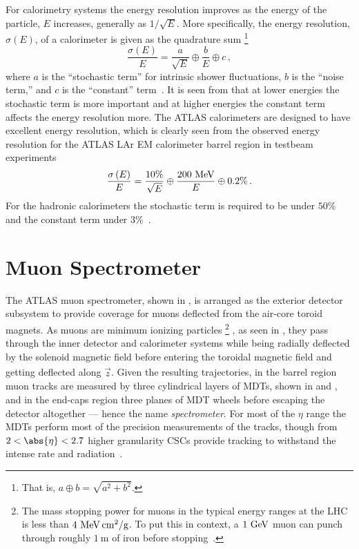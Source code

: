 For calorimetry systems the energy resolution improves as the energy of the particle, $E$ increases, generally as $1/\sqrt{E}$.
More specifically, the energy resolution, $\sigma\left(E\right)$, of a calorimeter is given as the quadrature sum%
\footnote{That is, $a \oplus b = \sqrt{a^{2} + b^{2}}$.}
\begin{equation}
 \frac{\sigma\left(E\right)}{E} = \frac{a}{\sqrt{E}} \oplus \frac{b}{E} \oplus c\,,
 \label{eq:calorimeter_energy_resolution}
\end{equation}
where $a$ is the ``stochastic term'' for intrinsic shower fluctuations, $b$ is the ``noise term,'' and $c$ is the ``constant'' term~\cite{Fabjan:692252}.
It is seen from  that at lower energies the stochastic term is more important and at higher energies the constant term affects the energy resolution more.
The ATLAS calorimeters are designed to have excellent energy resolution, which is clearly seen from the observed energy resolution for the ATLAS LAr EM calorimeter barrel region in testbeam experiments~\cite{Ilic:2014,Aleksa:1547314}
\[
 \frac{\sigma\left(E\right)}{E} = \frac{10\%}{\sqrt{E}} \oplus \frac{200~\mathrm{MeV}}{E} \oplus 0.2\%\,.
\]
For the hadronic calorimeters the stochastic term is required to be under $50\%$ and the constant term under $3\%$~\cite{Ilic:2014}.

\section{Muon Spectrometer}\label{sec:ATLAS_muon_spectrometer}

The ATLAS \gls{muon spectrometer}, shown in , is arranged as the exterior detector subsystem to provide coverage for muons deflected from the air-core toroid magnets.
As muons are minimum ionizing particles%
\footnote{The mass stopping power for muons in the typical energy ranges at the LHC is less than $4~\mathrm{MeV}\,\mathrm{cm}^{2}/\mathrm{g}$.
 To put this in context, a $1~\mathrm{GeV}$ muon can punch through roughly $1~\mathrm{m}$ of iron before stopping~\cite{Garutti:lecture}.}
, as seen in , they pass through the inner detector and calorimeter systems while being radially deflected by the solenoid magnetic field before entering the toroidal magnetic field and getting deflected along $\hat{\vec{z}}$.
Given the resulting trajectories, in the barrel region muon tracks are measured by three cylindrical layers of \glspl{MDT}, shown in  and , and in the end-caps region three planes of MDT wheels before escaping the detector altogether --- hence the name \emph{spectrometer}.
For most of the $\eta$ range the MDTs perform most of the precision measurements of the tracks, though from $2 < \abs{\eta} < 2.7$ higher granularity \glspl{CSC} provide tracking to withstand the intense rate and radiation~\cite{PERF-2007-01}.

